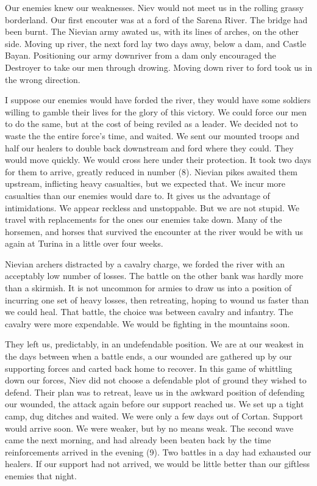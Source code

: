 \documentclass{article}
\begin{document}
Our enemies knew our weaknesses. Niev would not meet us in the rolling grassy borderland. Our first encouter was at a ford of the Sarena River. The bridge had been burnt. The Nievian army awated us, with its lines of arches, on the other side. Moving up river, the next ford lay two days away, below a dam, and Castle Bayan. Positioning our army downriver from a dam only encouraged the Destroyer to take our men through drowing. Moving down river to ford took us in the wrong direction. 

I suppose our enemies would have forded the river, they would have some soldiers willing to gamble their lives for the glory of this victory. We could force our men to do the same, but at the cost of being reviled as a leader. We decided not to waste the the entire force's time, and waited. We sent our mounted troops and half our healers to double back downstream and ford where they could. They would move quickly. We would cross here under their protection. It took two days for them to arrive, greatly reduced in number (8). Nievian pikes awaited them upstream, inflicting heavy casualties, but we expected that. We incur more casualties than our enemies would dare to. It gives us the advantage of intimidations. We appear reckless and unstoppable. But we are not stupid. We travel with replacements for the ones our enemies take down. Many of the horsemen, and horses that survived the encounter at the river would be with us again at Turina in a little over four weeks. 

Nievian archers distracted by a cavalry charge, we forded the river with an acceptably low number of losses. The battle on the other bank was hardly more than a skirmish. It is not uncommon for armies to draw us into a position of incurring one set of heavy losses, then retreating, hoping to wound us faster than we could heal. That battle, the choice was between cavalry and infantry. The cavalry were more expendable. We would be fighting in the mountains soon. 

They left us, predictably, in an undefendable position. We are at our weakest in the days between when a battle ends, a our wounded are gathered up by our supporting forces and carted back home to recover. In this game of whittling down our forces, Niev did not choose a defendable plot of ground they wished to defend. Their plan was to retreat, leave us in the awkward position of defending our wounded, the attack again before our support reached us. We set up a tight camp, dug ditches and waited. We were only a few days out of Cortan. Support would arrive soon. We were weaker, but by no means weak. The second wave came the next morning, and had already been beaten back by the time reinforcements arrived in the evening (9). Two battles in a day had exhausted our healers. If our support had not arrived, we would be little better than our giftless enemies that night.
\end{document}
